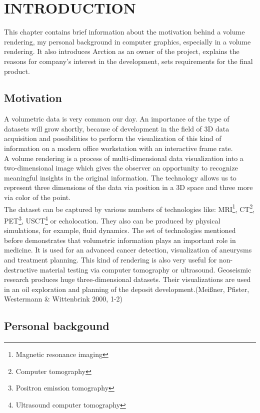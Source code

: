 \documentclass[twoside, english, 11pt]{report}
\begin{document}
\newpage

\tableofcontents

\chapter{INTRODUCTION}
This chapter contains brief information about the motivation behind a volume rendering, my personal background in computer graphics, especially in a volume rendering. It also introduces Arction as an owner of the project, explains the reasons for company's interest in the development, sets requirements for the final product.
\section{Motivation}

A volumetric data is very common our day. An importance of the type of datasets will grow shortly, because of development in the field of 3D data acquisition and possibilities to perform the visualization of this kind of information on a modern office workstation with an interactive frame rate.\\

A volume rendering is a process of multi-dimensional data visualization into a two-dimensional image which gives the observer an opportunity to recognize meaningful insights in the original information. The technology allows us to represent three dimensions of the data via position in a 3D space and three more via color of the point.\\

The dataset can be captured by various numbers of technologies like: MRI\footnote{Magnetic resonance imaging}, CT\footnote{Computer tomography}, PET\footnote{Positron emission tomography}, USCT\footnote{Ultrasound computer tomography} or echolocation. They also can be produced by physical simulations, for example, fluid dynamics. The set of technologies mentioned before demonstrates that volumetric information plays an important role in medicine. It is used for an advanced cancer detection, visualization of aneurysms and treatment planning. This kind of rendering is also very useful for non-destructive material testing via computer tomography or ultrasound. Geoseismic research produces huge three-dimensional datasets. Their visualizations are used in an oil exploration and planning of the deposit development.(Meißner, Pfister, Westermann \& Wittenbrink 2000, 1-2)\\


\section{Personal backgound}
\end{document}
